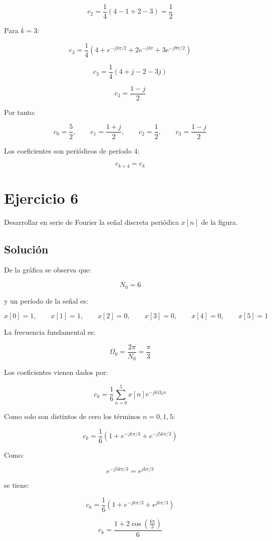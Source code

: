 \documentclass[fleqn]{article}
\begin{document}
	\[
	c_2
	=
	\frac{1}{4}
	(4-1+2-3)
	=
	\frac{1}{2}
	\]

	Para $k=3$:

	\[
	c_3
	=
	\frac{1}{4}
	\left(
	4
	+
	e^{-j3\pi/2}
	+
	2e^{-j3\pi}
	+
	3e^{-j9\pi/2}
	\right)
	\]

	\[
	c_3
	=
	\frac{1}{4}
	\left(
	4+j-2-3j
	\right)
	\]

	\[
	c_3
	=
	\frac{1-j}{2}
	\]

	Por tanto:

	\[
	\boxed{
	c_0=\frac{5}{2},
	\qquad
	c_1=\frac{1+j}{2},
	\qquad
	c_2=\frac{1}{2},
	\qquad
	c_3=\frac{1-j}{2}
	}
	\]

	Los coeficientes son periódicos de período $4$:

	\[
	\boxed{
	c_{k+4}=c_k
	}
	\]

\section{Ejercicio 6}
	Desarrollar en serie de Fourier la señal discreta periódica $x[n]$ de la figura.

	\subsection{Solución}

	De la gráfica se observa que:

	\[
	N_0=6
	\]

	y un período de la señal es:

	\[
	x[0]=1,\qquad
	x[1]=1,\qquad
	x[2]=0,\qquad
	x[3]=0,\qquad
	x[4]=0,\qquad
	x[5]=1
	\]

	La frecuencia fundamental es:

	\[
	\Omega_0
	=
	\frac{2\pi}{N_0}
	=
	\frac{\pi}{3}
	\]

	Los coeficientes vienen dados por:

	\[
	c_k
	=
	\frac{1}{6}
	\sum_{n=0}^{5}
	x[n]e^{-jk\Omega_0n}
	\]

	Como solo son distintos de cero los términos $n=0,1,5$:

	\[
	c_k
	=
	\frac{1}{6}
	\left(
	1+
	e^{-jk\pi/3}
	+
	e^{-j5k\pi/3}
	\right)
	\]

	Como:

	\[
	e^{-j5k\pi/3}
	=
	e^{jk\pi/3}
	\]

	se tiene:

	\[
	c_k
	=
	\frac{1}{6}
	\left(
	1+
	e^{-jk\pi/3}
	+
	e^{jk\pi/3}
	\right)
	\]

	\[
	\boxed{
	c_k
	=
	\frac{1+2\cos\left(\frac{k\pi}{3}\right)}{6}
	}
	\]
\end{document}
